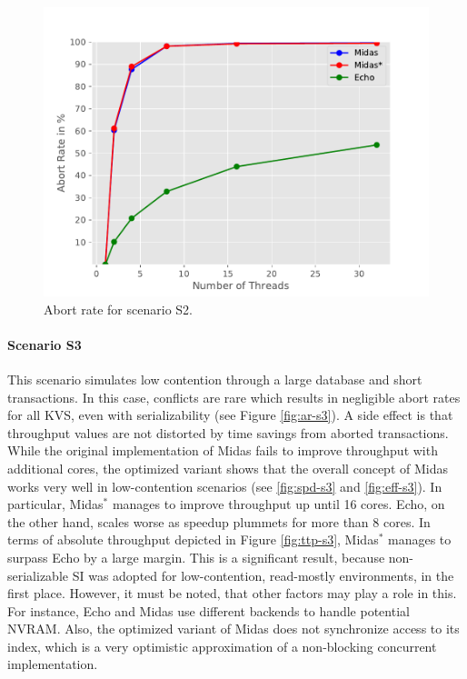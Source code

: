 \begin{figure}[h!]
\begin{minipage}[l]{0.50\textwidth}
    \label{fig:eff-s2}
\end{minipage}
\begin{minipage}[l]{0.50\textwidth}
    \includegraphics[width=\textwidth]{figures/bench/ar-sl}
    \caption{Abort rate for scenario S2.}
    \label{fig:ar-s2}
\end{minipage}
\end{figure}



\paragraph{Scenario S3}

This scenario simulates low contention through a large database and short transactions. In this case, conflicts are rare which results in negligible abort rates for all KVS, even with serializability (see Figure \ref{fig:ar-s3}). A side effect is that throughput values are not distorted by time savings from aborted transactions. While the original implementation of Midas fails to improve throughput with additional cores, the optimized variant shows that the overall concept of Midas works very well in low-contention scenarios (see \ref{fig:spd-s3} and \ref{fig:eff-s3}). In particular, Midas$^{*}$ manages to improve throughput up until 16 cores. Echo, on the other hand, scales worse as speedup plummets for more than 8 cores. In terms of absolute throughput depicted in Figure \ref{fig:ttp-s3}, Midas$^{*}$ manages to surpass Echo by a large margin. This is a significant result, because non-serializable SI was adopted for low-contention, read-mostly environments, in the first place. However, it must be noted, that other factors may play a role in this. For instance, Echo and Midas use different backends to handle potential NVRAM. Also, the optimized variant of Midas does not synchronize access to its index, which is a very optimistic approximation of a non-blocking concurrent implementation.

